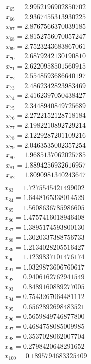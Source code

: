 \begin{multicols}{3}
\begin{align*}
		x_{65} = 2.9952196902850702\\
		x_{66} = 2.9367455313930225\\
		x_{67} = 2.8767566370039185\\
		x_{68} = 2.8152756070057247\\
		x_{69} = 2.7523243683867061\\
		x_{70} = 2.6879242130190810\\
		x_{71} = 2.6220958501560915\\
		x_{72} = 2.5548593686640197\\
		x_{73} = 2.4862342823983469\\
		x_{74} = 2.4162397050438427\\
		x_{75} = 2.3448940849725689\\
		x_{76} = 2.2722152128718184\\
		x_{77} = 2.1982210892729214\\
		x_{78} = 2.1229287201109216\\
		x_{79} = 2.0463535002357254\\
		x_{80} = 1.9685137062025785\\
		x_{81} = 1.8894256932616957\\
		x_{82} = 1.8090981340243647\\
	\end{align*}
	\vfill
	\columnbreak
	\begin{align*}
		x_{83} = 1.7275545421499002\\
		x_{84} = 1.6448165338014529\\
		x_{85} = 1.5608636785986605\\
		x_{86} = 1.4757416018946408\\
		x_{87} = 1.3895174593800130\\
		x_{88} = 1.3020337388756733\\
		x_{89} = 1.2134028205516427\\
		x_{90} = 1.1239837101476174\\
		x_{91} = 1.0329873606760617\\
		x_{92} = 0.9406162762941549\\
		x_{93} = 0.8489160889277005\\
		x_{94} = 0.7543267064481112\\
		x_{95} = 0.6562892698483521\\
		x_{96} = 0.5659849746877800\\
		x_{97} = 0.4684758085009985\\
		x_{98} = 0.3537028062007704\\
		x_{99} = 0.2798420648291652\\
		x_{100} = 0.1895794683325409
	\end{align*}
\end{multicols}
